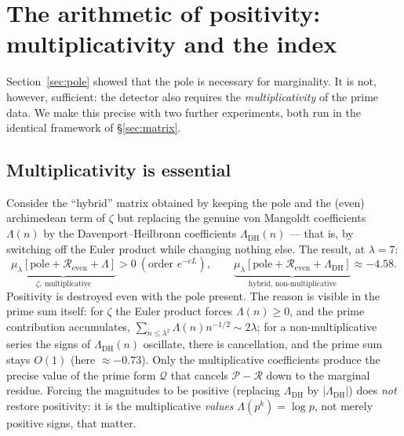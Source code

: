 \documentclass[11pt]{amsart}
\theoremstyle{definition}
\theoremstyle{remark}
\newcommand{\lam}{\lambda}
\begin{document}
\section{The arithmetic of positivity: multiplicativity and the index}\label{sec:euler}

Section~\ref{sec:pole} showed that the pole is necessary for marginality. It is not, however, sufficient: the detector also requires the \emph{multiplicativity} of the prime data. We make this precise with two further experiments, both run in the identical framework of \S\ref{sec:matrix}.

\subsection{Multiplicativity is essential}
Consider the ``hybrid'' matrix obtained by keeping the pole and the (even) archimedean term of $\zeta$ but replacing the genuine von Mangoldt coefficients $\Lambda(n)$ by the Davenport--Heilbronn coefficients $\Lambda_{\mathrm{DH}}(n)$ --- that is, by switching off the Euler product while changing nothing else. The result, at $\lam=7$:
\[
\underbrace{\mu_\lam[\text{pole}+\mathcal R_{\mathrm{even}}+\Lambda]}_{\zeta,\ \text{multiplicative}}>0\ (\text{order }e^{-cL}),
\qquad
\underbrace{\mu_\lam[\text{pole}+\mathcal R_{\mathrm{even}}+\Lambda_{\mathrm{DH}}]}_{\text{hybrid, non-multiplicative}}\approx -4.58 .
\]
Positivity is destroyed even with the pole present. The reason is visible in the prime sum itself: for $\zeta$ the Euler product forces $\Lambda(n)\ge 0$, and the prime contribution accumulates, $\sum_{n\le\lam^2}\Lambda(n)n^{-1/2}\sim 2\lam$; for a non-multiplicative series the signs of $\Lambda_{\mathrm{DH}}(n)$ oscillate, there is cancellation, and the prime sum stays $O(1)$ (here $\approx-0.73$). Only the multiplicative coefficients produce the precise value of the prime form $\mathcal Q$ that cancels $\mathcal P-\mathcal R$ down to the marginal residue. Forcing the magnitudes to be positive (replacing $\Lambda_{\mathrm{DH}}$ by $|\Lambda_{\mathrm{DH}}|$) does \emph{not} restore positivity: it is the multiplicative \emph{values} $\Lambda(p^k)=\log p$, not merely positive signs, that matter.
\end{document}
